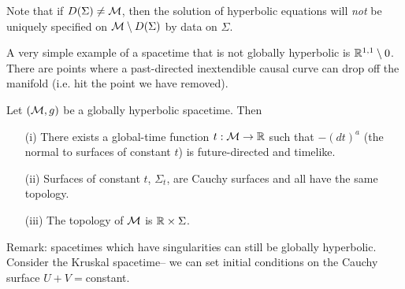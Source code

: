 Note that if $D(\Sigma)\neq \mathcal{M}$, then the solution of hyperbolic equations will \emph{not} be uniquely specified on $\mathcal{M}\setminus D(\Sigma)$ by data on $\Sigma$.
\begin{exm}
    A very simple example of a spacetime that is not globally hyperbolic is $\mathbb{R}^{1,1}\setminus{0}$. There are points where a past-directed inextendible causal curve can drop off the manifold (i.e. hit the point we have removed).
\end{exm}
\begin{thm}[Wald]
    Let $(\mathcal{M},g)$ be a globally hyperbolic spacetime. Then
    \begin{enumerate}
        \item[(i)] There exists a global-time function $t:\mathcal{M} \to \mathbb{R}$ such that $-(dt)^a$ (the normal to surfaces of constant $t$) is future-directed and timelike.
        \item[(ii)] Surfaces of constant $t$, $\Sigma_t$, are Cauchy surfaces and all have the same topology.
        \item[(iii)] The topology of $\mathcal{M}$ is $\mathbb{R}\times \Sigma$.
    \end{enumerate}
\end{thm}
Remark: spacetimes which have singularities can still be globally hyperbolic. Consider the Kruskal spacetime-- we can set initial conditions on the Cauchy surface $U+V={}$constant.

